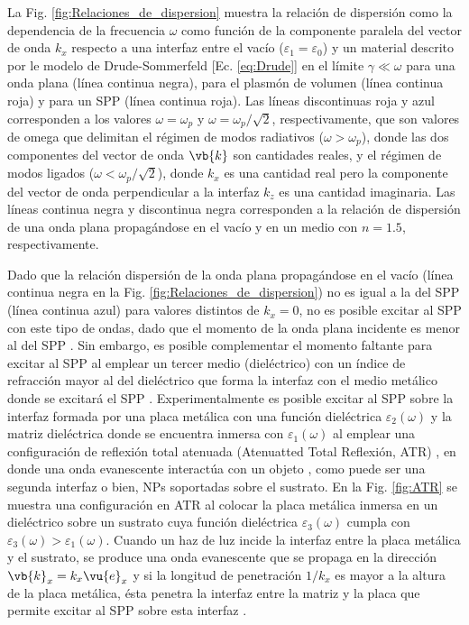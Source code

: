 La Fig. \ref{fig:Relaciones_de_dispersion} muestra la relación de dispersión como la dependencia de la frecuencia $\omega$ como función de la componente paralela del vector de onda $k_x$ respecto a una interfaz entre el vacío ($\varepsilon_1=\varepsilon_0$) y un material descrito por le modelo de Drude-Sommerfeld [Ec. \eqref{eq:Drude}] en el límite $\gamma\ll\omega$ para una onda plana  (línea continua negra), para el plasmón de volumen (línea continua roja) y para un SPP (línea continua roja). Las líneas discontinuas roja y azul corresponden a los valores $\omega=\omega_p$ y $\omega=\omega_p/\sqrt{2}$, respectivamente, que son valores de omega que delimitan el régimen de modos radiativos ($\omega>\omega_p$), donde las dos componentes del vector de onda $\vb{k}$ son cantidades reales, y el régimen de modos ligados ($\omega<\omega_p/\sqrt{2}$), donde $k_x$ es una cantidad real pero la componente del vector de onda perpendicular a la interfaz $k_z$ es una cantidad imaginaria. Las líneas continua negra y discontinua negra corresponden a la relación de dispersión de una onda plana propagándose en el vacío y en un medio con $n=1.5$, respectivamente.

	

Dado que la relación dispersión de la onda plana propagándose en el vacío (línea continua negra en la Fig. \ref{fig:Relaciones_de_dispersion}) no es igual a la del SPP (línea continua azul) para valores distintos de $k_x=0$, no es posible excitar al SPP con este tipo de ondas, dado que el momento de la onda plana incidente es menor al del SPP \cite{trugler2011properties}. Sin embargo, es posible complementar el momento faltante para excitar al SPP al emplear un tercer medio (dieléctrico) con un índice de refracción mayor al del dieléctrico que forma la interfaz con el medio metálico donde se excitará el SPP \cite{trugler2011properties}. Experimentalmente es posible excitar al SPP sobre la interfaz formada por una placa metálica con una función dieléctrica $\varepsilon_2(\omega)$ y la matriz dieléctrica donde se encuentra inmersa con $\varepsilon_1(\omega)$ al emplear una configuración de reflexión total atenuada (Atenuatted Total Reflexión, ATR) \cite{kabashin2009plasmonic}, en donde una onda evanescente interactúa con un objeto \cite{hecht1998optics}, como puede ser una segunda interfaz o bien, NPs soportadas sobre el sustrato. En la Fig. \ref{fig:ATR} se muestra una configuración en ATR al colocar la placa metálica inmersa en un dieléctrico sobre un sustrato cuya función dieléctrica $\varepsilon_3(\omega)$ cumpla con $\varepsilon_3(\omega)>\varepsilon_1(\omega)$. Cuando un haz de luz incide la interfaz entre la placa metálica y el sustrato, se produce una onda evanescente que se propaga en la dirección $\vb{k}_x=k_x\vu{e}_x$ y si la longitud de penetración $1/k_x$ es mayor a la altura de la placa metálica, ésta penetra la interfaz entre la matriz y la placa que permite excitar al SPP sobre esta interfaz \cite{trugler2011properties}. 	
	
